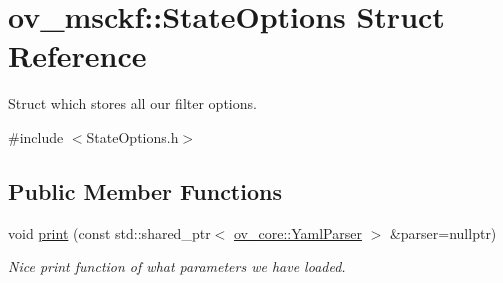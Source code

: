 \hypertarget{structov__msckf_1_1StateOptions}{}\section{ov\+\_\+msckf\+:\+:State\+Options Struct Reference}
\label{structov__msckf_1_1StateOptions}


Struct which stores all our filter options.  




{\ttfamily \#include $<$State\+Options.\+h$>$}

\subsection*{Public Member Functions}
\begin{DoxyCompactItemize}
\item 
\mbox{\label{structov__msckf_1_1StateOptions_a053913ab9567ff179ec6ed6dbaef46a8}} 
void \hyperlink{structov__msckf_1_1StateOptions_a053913ab9567ff179ec6ed6dbaef46a8}{print} (const std\+::shared\+\_\+ptr$<$ \hyperlink{classov__core_1_1YamlParser}{ov\+\_\+core\+::\+Yaml\+Parser} $>$ \&parser=nullptr)
\begin{DoxyCompactList}\small\item\em Nice print function of what parameters we have loaded. \end{DoxyCompactList}\end{DoxyCompactItemize}
